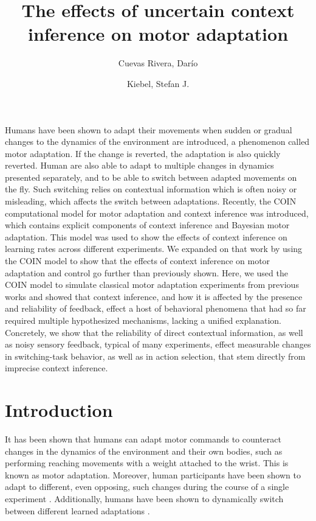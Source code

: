 \documentclass[a4paper,doc,floatsintext,natbib]{apa6}
\title{The effects of uncertain context inference on motor adaptation}
\author[1,2]{Cuevas Rivera, Darío}
\author[1,2]{Kiebel, Stefan J.}
\affil[1]{Chair of Neuroimaging, Faculty of Psychology, Technische Universität Dresden, 01062 Dresden, Germany.}
\affil[2]{Centre for Tactile Internet with Human-in-the-Loop (CeTI)}
\affiliation{~}
\begin{document}
\maketitle

Humans have been shown to adapt their movements when sudden or gradual changes to the dynamics of the environment are introduced, a phenomenon called motor adaptation. If the change is reverted, the adaptation is also quickly reverted. Human are also able to adapt to multiple changes in dynamics presented separately, and to be able to switch between adapted movements on the fly. Such switching relies on contextual information which is often noisy or misleading, which affects the switch between adaptations. Recently, the COIN computational model for motor adaptation and context inference was introduced, which contains explicit components of context inference and Bayesian motor adaptation. This model was used to show the effects of context inference on learning rates across different experiments. We expanded on that work by using the COIN model to show that the effects of context inference on motor adaptation and control go further than previously shown. Here, we used the COIN model to simulate classical motor adaptation experiments from previous works and showed that context inference, and how it is affected by the presence and reliability of feedback, effect a host of behavioral phenomena that had so far required multiple hypothesized mechanisms, lacking a unified explanation. Concretely, we show that the reliability of direct contextual information, as well as noisy sensory feedback, typical of many experiments, effect measurable changes in switching-task behavior, as well as in action selection, that stem directly from imprecise context inference. 


\section{Introduction}
It has been shown that humans can adapt motor commands to counteract changes in the dynamics of the environment and their own bodies, such as performing reaching movements with a weight attached to the wrist. This is known as motor adaptation. Moreover, human participants have been shown to adapt to different, even opposing, such changes during the course of a single experiment \citep{Gandolfo_Motor_1996,Shadmehr_Functional_1997}. Additionally, humans have been shown to dynamically switch between different learned adaptations \citep{Davidson_Scaling_2004,Ethier_Spontaneous_2008,Lee_Dual_2009}.
\end{document}
